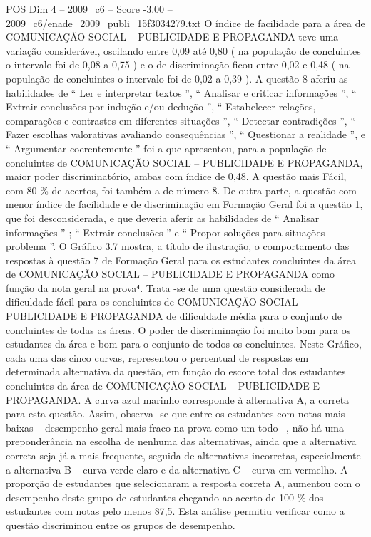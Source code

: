 \begin{textsample}{POS Dim 4 – 2009\_c6 – Score -3.00 – 2009\_c6/enade\_2009\_publi\_15f3034279.txt}
O índice de facilidade para a área de COMUNICAÇÃO SOCIAL – PUBLICIDADE E PROPAGANDA teve uma variação considerável, oscilando entre 0,09 até 0,80 ( na população de concluintes o intervalo foi de 0,08 a 0,75 ) e o de discriminação ficou entre 0,02 e 0,48 ( na população de concluintes o intervalo foi de 0,02 a 0,39 ).
A questão 8 aferiu as habilidades de “ Ler e interpretar textos ”, “ Analisar e criticar informações ”, “ Extrair conclusões por indução e/ou dedução ”, “ Estabelecer relações, comparações e contrastes em diferentes situações ”, “ Detectar contradições ”, “ Fazer escolhas valorativas avaliando consequências ”, “ Questionar a realidade ”, e “ Argumentar coerentemente ” foi a que apresentou, para a população de concluintes de COMUNICAÇÃO SOCIAL – PUBLICIDADE E PROPAGANDA, maior poder discriminatório, ambas com índice de 0,48.
A questão mais Fácil, com 80 \% de acertos, foi também a de número 8.
De outra parte, a questão com menor índice de facilidade e de discriminação em Formação Geral foi a questão 1, que foi desconsiderada, e que deveria aferir as habilidades de “ Analisar informações ” ; “ Extrair conclusões ” e “ Propor soluções para situações-problema ”.
O Gráfico 3.7 mostra, a título de ilustração, o comportamento das respostas à questão 7 de Formação Geral para os estudantes concluintes da área de COMUNICAÇÃO SOCIAL – PUBLICIDADE E PROPAGANDA como função da nota geral na prova⁴.
Trata -se de uma questão considerada de dificuldade fácil para os concluintes de COMUNICAÇÃO SOCIAL – PUBLICIDADE E PROPAGANDA de dificuldade média para o conjunto de concluintes de todas as áreas.
O poder de discriminação foi muito bom para os estudantes da área e bom para o conjunto de todos os concluintes.
Neste Gráfico, cada uma das cinco curvas, representou o percentual de respostas em determinada alternativa da questão, em função do escore total dos estudantes concluintes da área de COMUNICAÇÃO SOCIAL – PUBLICIDADE E PROPAGANDA.
A curva azul marinho corresponde à alternativa A, a correta para esta questão.
Assim, observa -se que entre os estudantes com notas mais baixas – desempenho geral mais fraco na prova como um todo –, não há uma preponderância na escolha de nenhuma das alternativas, ainda que a alternativa correta seja já a mais frequente, seguida de alternativas incorretas, especialmente a alternativa B – curva verde claro e da alternativa C – curva em vermelho.
A proporção de estudantes que selecionaram a resposta correta A, aumentou com o desempenho deste grupo de estudantes chegando ao acerto de 100 \% dos estudantes com notas pelo menos 87,5.
Esta análise permitiu verificar como a questão discriminou entre os grupos de desempenho.

\end{textsample}
